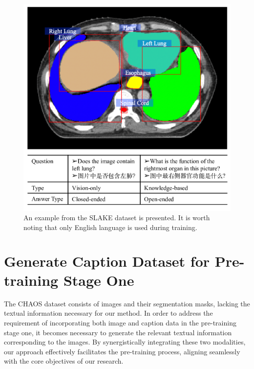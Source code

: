 \begin{figure}[t]
\begin{center}
\includegraphics[width=1.0\linewidth]{Chapter_3/chap3_slake.png}
\end{center}
   \caption{An example from the SLAKE dataset is presented. It is worth noting that only English language is used during training.
}
\label{fig:slake}
\end{figure}


\section{Generate Caption Dataset for Pre-training Stage One}
\label{Gencaption}

The CHAOS dataset consists of images and their segmentation masks, lacking the textual information necessary for our method. In order to address the requirement of incorporating both image and caption data in the pre-training stage one, it becomes necessary to generate the relevant textual information corresponding to the images. By synergistically integrating these two modalities, our approach effectively facilitates the pre-training process, aligning seamlessly with the core objectives of our research.

